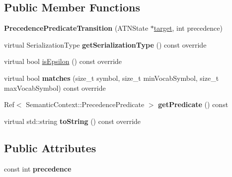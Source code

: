 \subsection*{Public Member Functions}
\begin{DoxyCompactItemize}
\item 
\mbox{\label{classantlr4_1_1atn_1_1PrecedencePredicateTransition_a718f61f88d240986227971b038329cb5}} 
{\bfseries Precedence\+Predicate\+Transition} (A\+T\+N\+State $\ast$\hyperlink{classantlr4_1_1atn_1_1Transition_aaaed7f4ddda71e156b36de33e88f66a7}{target}, int precedence)
\item 
\mbox{\label{classantlr4_1_1atn_1_1PrecedencePredicateTransition_ae623877b74ad971e4d0f35598a3bc291}} 
virtual Serialization\+Type {\bfseries get\+Serialization\+Type} () const override
\item 
virtual bool \hyperlink{classantlr4_1_1atn_1_1PrecedencePredicateTransition_a68e686bc0b7ddce9b5fc3f93a763ca52}{is\+Epsilon} () const override
\item 
\mbox{\label{classantlr4_1_1atn_1_1PrecedencePredicateTransition_ad0b95c2970eb78a8218e608523df69cf}} 
virtual bool {\bfseries matches} (size\+\_\+t symbol, size\+\_\+t min\+Vocab\+Symbol, size\+\_\+t max\+Vocab\+Symbol) const override
\item 
\mbox{\label{classantlr4_1_1atn_1_1PrecedencePredicateTransition_a40ff738d5bd550cb3075f21dc38320f6}} 
Ref$<$ Semantic\+Context\+::\+Precedence\+Predicate $>$ {\bfseries get\+Predicate} () const
\item 
\mbox{\label{classantlr4_1_1atn_1_1PrecedencePredicateTransition_a15bbcebde23a756c8bef8cc0ed7cedcd}} 
virtual std\+::string {\bfseries to\+String} () const override
\end{DoxyCompactItemize}
\subsection*{Public Attributes}
\begin{DoxyCompactItemize}
\item 
\mbox{\label{classantlr4_1_1atn_1_1PrecedencePredicateTransition_a2fb179a0fe34a3264488fbb5e8286fc0}} 
const int {\bfseries precedence}
\end{DoxyCompactItemize}
